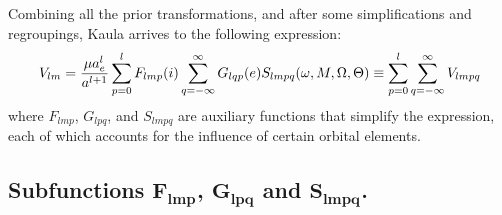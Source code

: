 	\indent Combining all the prior transformations, and after some simplifications and regroupings, Kaula arrives to the following expression:
	\begin{align}
	V_{lm} = \dfrac{\mu a_e^l}{a^{l+1}} \displaystyle\sum_{p = 0}^l F_{lmp}(i) \displaystyle\sum_{q = -\infty} ^{\infty} G_{lqp}(e) S_{lmpq}(\omega, M, \Omega, \Theta) \equiv \displaystyle\sum_{p = 0}^{l} \displaystyle\sum_{q = -\infty}^{\infty} V_{lmpq} 
	\label{eq:V_lm_2}
	\end{align}
	\noindent where $F_{lmp}$, $G_{lpq}$, and $S_{lmpq}$ are auxiliary functions that simplify the expression, each of which accounts for the influence of certain orbital elements.\\
	\subsection{Subfunctions $\bm{F_{lmp}}$, $\bm{ G_{lpq}}$ and $\bm{ S_{lmpq}}$.}
